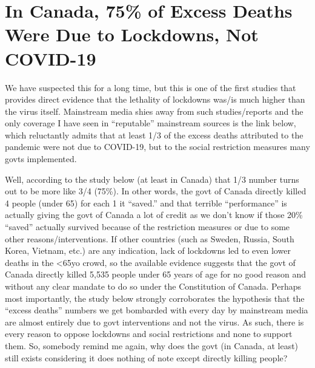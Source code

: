 \chapter{In Canada, 75\% of Excess Deaths Were Due to Lockdowns, Not COVID-19}

\begin{refsection}

We have suspected this for a long time, but this is one of the first studies that provides direct evidence that the lethality of lockdowns was/is much higher than the virus itself. Mainstream media shies away from such studies/reports and the only coverage I have seen in \enquote{reputable} mainstream sources is the link below, which reluctantly admits that at least 1/3 of the excess deaths attributed to the pandemic were not due to COVID-19, but to the social restriction measures many govts implemented.

Well, according to the study below (at least in Canada) that 1/3 number turns out to be more like 3/4 (75\%). In other words, the govt of Canada directly killed 4 people (under 65) for each 1 it \enquote{saved.} and that terrible \enquote{performance} is actually giving the govt of Canada a lot of credit as we don't know if those 20\% \enquote{saved} actually survived because of the restriction measures or due to some other reasons/interventions. If other countries (such as Sweden, Russia, South Korea, Vietnam, etc.) are any indication, lack of lockdowns led to even lower deaths in the <65yo crowd, so the available evidence suggests that the govt of Canada directly killed 5,535 people under 65 years of age for no good reason and without any clear mandate to do so under the Constitution of Canada. Perhaps most importantly, the study below strongly corroborates the hypothesis that the \enquote{excess deaths} numbers we get bombarded with every day by mainstream media are almost entirely due to govt interventions and not the virus. As such, there is every reason to oppose lockdowns and social restrictions and none to support them. So, somebody remind me again, why does the govt (in Canada, at least) still exists considering it does nothing of note except directly killing people?\textsuperscript{\cite{url290hsdbas}}

\begin{tcolorbox}[quote]


\end{tcolorbox}
\end{refsection}
